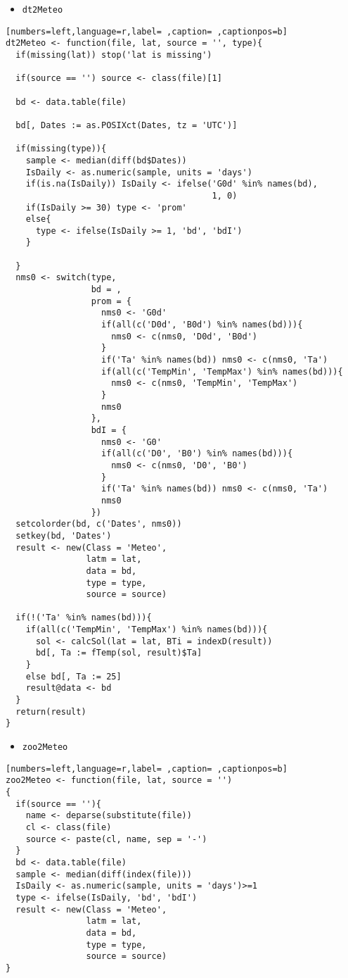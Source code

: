 \begin{itemize}
\item \texttt{dt2Meteo}
\end{itemize}
\begin{lstlisting}[numbers=left,language=r,label= ,caption= ,captionpos=b]
dt2Meteo <- function(file, lat, source = '', type){
  if(missing(lat)) stop('lat is missing')

  if(source == '') source <- class(file)[1]
  
  bd <- data.table(file)

  bd[, Dates := as.POSIXct(Dates, tz = 'UTC')]

  if(missing(type)){
    sample <- median(diff(bd$Dates))
    IsDaily <- as.numeric(sample, units = 'days')
    if(is.na(IsDaily)) IsDaily <- ifelse('G0d' %in% names(bd),
                                         1, 0)
    if(IsDaily >= 30) type <- 'prom'
    else{
      type <- ifelse(IsDaily >= 1, 'bd', 'bdI') 
    }
    
  }
  nms0 <- switch(type,
                 bd = ,
                 prom = {
                   nms0 <- 'G0d'
                   if(all(c('D0d', 'B0d') %in% names(bd))){
                     nms0 <- c(nms0, 'D0d', 'B0d')
                   }
                   if('Ta' %in% names(bd)) nms0 <- c(nms0, 'Ta')
                   if(all(c('TempMin', 'TempMax') %in% names(bd))){
                     nms0 <- c(nms0, 'TempMin', 'TempMax')
                   }
                   nms0
                 },
                 bdI = {
                   nms0 <- 'G0'
                   if(all(c('D0', 'B0') %in% names(bd))){
                     nms0 <- c(nms0, 'D0', 'B0')
                   }
                   if('Ta' %in% names(bd)) nms0 <- c(nms0, 'Ta')
                   nms0
                 })
  setcolorder(bd, c('Dates', nms0))
  setkey(bd, 'Dates')
  result <- new(Class = 'Meteo',
                latm = lat,
                data = bd,
                type = type,
                source = source)
  
  if(!('Ta' %in% names(bd))){
    if(all(c('TempMin', 'TempMax') %in% names(bd))){
      sol <- calcSol(lat = lat, BTi = indexD(result))
      bd[, Ta := fTemp(sol, result)$Ta]
    }
    else bd[, Ta := 25]
    result@data <- bd
  }
  return(result)
}
\end{lstlisting}
\begin{itemize}
\item \texttt{zoo2Meteo}
\end{itemize}
\begin{lstlisting}[numbers=left,language=r,label= ,caption= ,captionpos=b]
zoo2Meteo <- function(file, lat, source = '')
{
  if(source == ''){
    name <- deparse(substitute(file))
    cl <- class(file)
    source <- paste(cl, name, sep = '-')
  }
  bd <- data.table(file)
  sample <- median(diff(index(file)))
  IsDaily <- as.numeric(sample, units = 'days')>=1
  type <- ifelse(IsDaily, 'bd', 'bdI')
  result <- new(Class = 'Meteo',
                latm = lat,
                data = bd,
                type = type,
                source = source)
}
\end{lstlisting}
